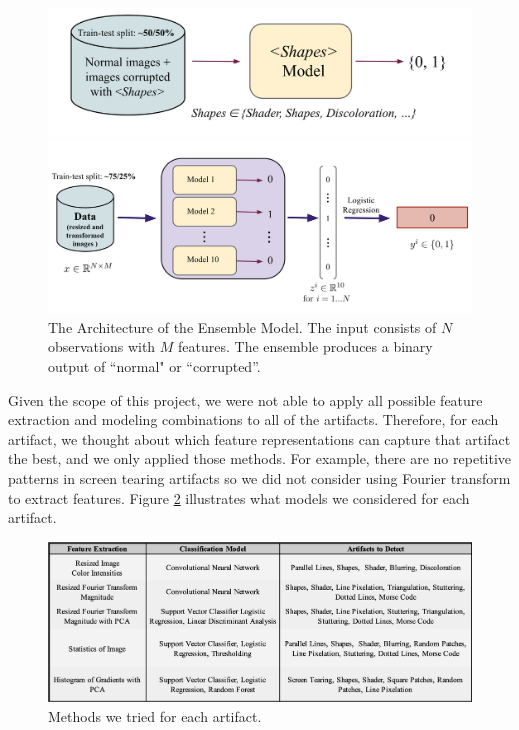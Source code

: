\begin{figure}[!h]
  \centering
  \includegraphics[scale=0.3]{images/stage_1.png}
  \caption*{Training Stage 1.}
  \centering
  \includegraphics[scale=0.4]{images/stage2.png}
  \caption*{Training Stage 2.}
\caption[Ensemble Model]{The Architecture of the Ensemble Model. The input consists of $N$ observations with $M$ features. The ensemble produces a binary output of ``normal" or ``corrupted''. }
\label{fig:ensemble}
\end{figure}

\noindent 
Given the scope of this project, we were not able to apply all possible feature extraction and modeling combinations to all of the artifacts. Therefore, for each artifact, we thought about which feature representations can capture that artifact the best, and we only applied those methods. For example, there are no repetitive patterns in screen tearing artifacts so we did not consider using Fourier transform to extract features. Figure \ref{fig:methods-tried} illustrates what models we considered for each artifact.

\begin{figure}[!h]
  \centering
  \includegraphics[scale=0.3]{images/results-methods.png}
  \caption{Methods we tried for each artifact.}
\label{fig:methods-tried}
\end{figure}


